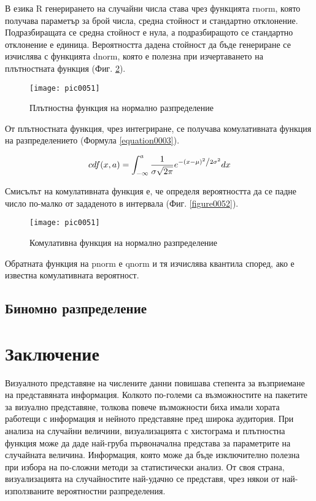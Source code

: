 В езика R генерирането на случайни числа става чрез функцията rnorm, която получава параметър за брой числа, средна стойност и стандартно отклонение. Подразбиращата се средна стойност е нула, а подразбиращото се стандартно отклонение е единица. Вероятността дадена стойност да бъде генериране се изчислява с функцията dnorm, която е полезна при изчертаването на плътностната функция (Фиг. \ref{figure0051}).

\begin{figure}[h!]
  \centering
  \texttt{[image: pic0051]}
  \caption{Плътностна функция на нормално разпределение}
\label{figure0051}
\end{figure}
\FloatBarrier

От плътностната функция, чрез интегриране, се получава комулативната функция на разпределението (Формула \ref{equation0003}).

\begin{equation}
cdf({x}, {a}) = \int_{-\infty}^{a} \frac{1}{{\sigma \sqrt {2\pi } }}e^{{{ - \left( {x - \mu } \right)^2 } \mathord{\left/ {\vphantom {{ - \left( {x - \mu } \right)^2 } {2\sigma ^2 }}} \right. \kern-\nulldelimiterspace} {2\sigma ^2 }}} dx
\label{equation0003}
\end{equation}

Смисълът на комулативната функция е, че определя вероятността да се падне число по-малко от зададеното в интервала (Фиг. \ref{figure0052}).

\begin{figure}[h!]
  \centering
  \texttt{[image: pic0051]}
  \caption{Комулативна функция на нормално разпределение}
\label{figure0051}
\end{figure}
\FloatBarrier

Обратната функция на pnorm е qnorm и тя изчислява квантила според, ако е известна комулативната вероятност.

\subsection{Биномно разпределение}



\section*{Заключение}

Визуалното представяне на числените данни повишава степента за възприемане на представяната информация. Колкото по-големи са възможностите на пакетите за визуално представяне, толкова повече възможности биха имали хората работещи с информация и нейното представяне пред широка аудитория. При анализа на случайни величини, визуализацията с хистограма и плътностна функция може да даде най-груба първоначална представа за параметрите на случайната величина. Информация, която може да бъде изключително полезна при избора на по-сложни методи за статистически анализ. От своя страна, визуализацията на случайностите най-удачно се представя, чрез някои от най-използваните вероятностни разпределения. 

